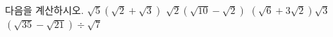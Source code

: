 다음을 계산하시오.
 $\sqrt{5}(\sqrt{2}+\sqrt{3})$
 $\sqrt{2}(\sqrt{10}-\sqrt{2})$
 $(\sqrt{6}+3\sqrt{2})\sqrt{3}$
 $(\sqrt{35}-\sqrt{21})\div\sqrt{7}$
